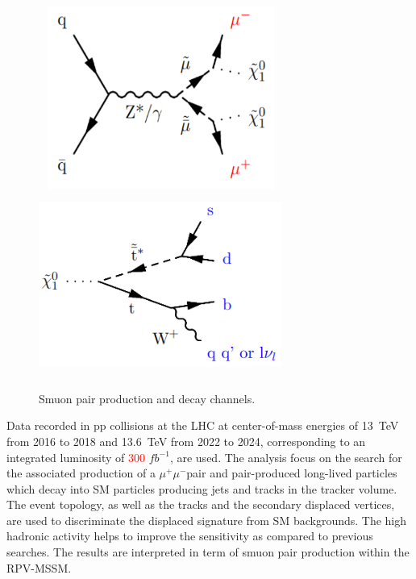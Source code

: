 \documentclass{cernatlasnote}
\newcommand{\mumu}{\ensuremath{\mu^{+}\mu^{-}}}
\begin{document}
\begin{figure}[ht]
\centering
\includegraphics[height=6cm, width=8cm, trim= 0cm 0cm 0cm 0.cm,clip]{images/Feynmann/smuprod.png}\includegraphics[height=6cm, width=8cm, trim= 0cm 0cm 0cm 0.cm,clip]{images/Feynmann/ChiDecay.png}
\caption{\label{fig:Feyn} Smuon pair production and decay channels.}
\end{figure}

Data recorded in pp collisions at the LHC at center-of-mass energies of 13~TeV from 2016 to 2018 and 13.6~TeV from 2022 to 2024, corresponding to an integrated luminosity of \textcolor{red}{300} $fb^{-1}$, are used. 
The analysis focus on the search for the associated production of a \mumu pair and pair-produced long-lived particles which decay into SM particles producing jets and tracks in the tracker volume. The event topology, as well as the tracks and the secondary displaced vertices, are used to discriminate the displaced signature from SM backgrounds. The high hadronic activity helps to improve the sensitivity as compared to previous searches. The results are interpreted in term of smuon pair production within the RPV-MSSM.


\end{document}
